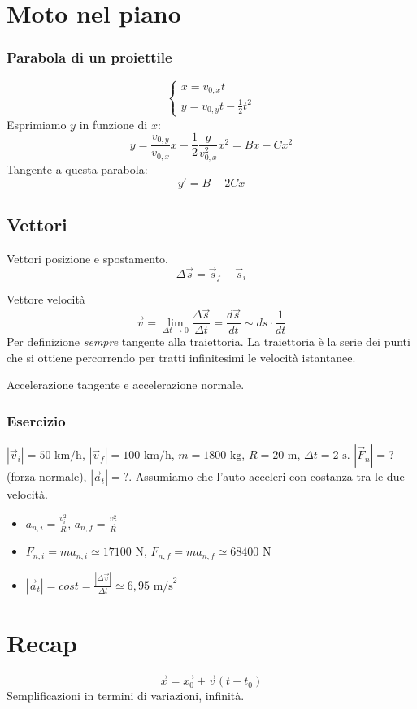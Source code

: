 \section{Moto nel piano}

\subsubsection*{Parabola di un proiettile}
\[
    \begin{cases}
        x = v_{0,x}t\\
        y = v_{0,y}t - \frac{1}{2}t^2
    \end{cases}
\]
Esprimiamo $y$ in funzione di $x$:
\[
    y = \frac{v_{0,y}}{v_{0,x}}x - \frac{1}{2}\frac{g}{v_{0,x}^2}x^2 = Bx - Cx^2
\]
Tangente a questa parabola:
\[
    y' = B - 2Cx
\]

\subsection{Vettori}
Vettori posizione e spostamento.
\[ \Delta\overrightarrow{s} = \overrightarrow{s}_f - \overrightarrow{s}_i \]

Vettore velocità
\[ \overrightarrow{v} = \lim_{\Delta t \to 0}\frac{\Delta\overrightarrow{s}}{\Delta t} = \frac{d\overrightarrow{s}}{dt} \sim ds\cdot\frac{1}{dt} \]
Per definizione \textit{sempre} tangente alla traiettoria. La traiettoria
è la serie dei punti che si ottiene percorrendo per tratti infinitesimi le
velocità istantanee.

Accelerazione tangente e accelerazione normale.


\subsubsection*{Esercizio}
$|\overrightarrow{v}_i| = 50\text{ km/h}$, $|\overrightarrow{v}_f| = 100\text{ km/h}$,
$m = 1800\text{ kg}$, $R = 20\text{ m}$, $\Delta t = 2\text{ s}$. $|\overrightarrow{F}_n| = ?$ (forza normale),
$|\overrightarrow{a}_t| = ?$. Assumiamo che l'auto acceleri con costanza tra le
due velocità.

\begin{itemize}
    \item $a_{n,i} = \frac{v_i^2}{R}$, $a_{n,f} = \frac{v_f^2}{R}$
    \item $F_{n,i} = ma_{n,i} \simeq 17100 \text{ N}$, $F_{n,f} = ma_{n,f} \simeq 68400\text{ N}$
    \item $|\overrightarrow{a}_t| = \textit{cost} = \frac{|\Delta\overrightarrow{v}|}{\Delta t} \simeq 6,95\text{ m/s}^2$
\end{itemize}


\section*{Recap}
\[ \overrightarrow{x} = \overrightarrow{x_0} + \overrightarrow{v}(t - t_0) \]
Semplificazioni in termini di variazioni, infinità.